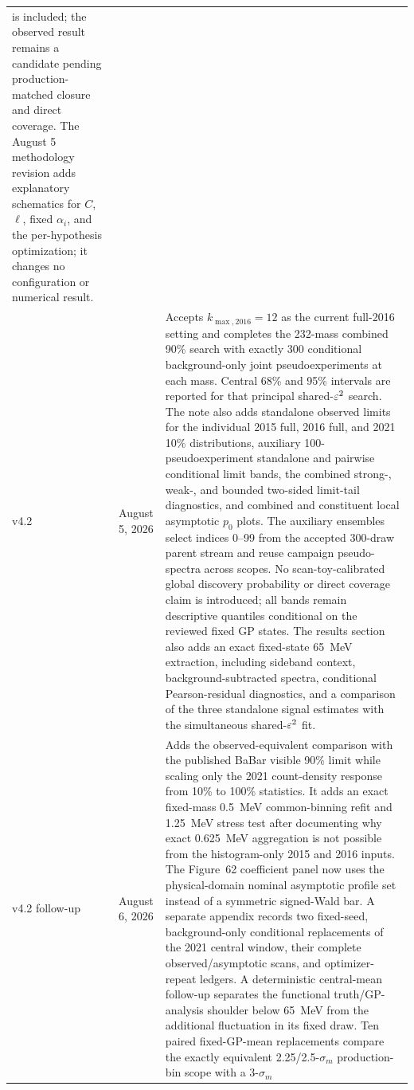 \begin{longtable}{P{0.11\textwidth}P{0.16\textwidth}P{0.64\textwidth}}
is included; the observed result remains a candidate pending production-matched
closure and direct coverage. The August 5 methodology revision adds explanatory
schematics for $C$, $\ell$, fixed $\alpha_i$, and the per-hypothesis optimization;
it changes no configuration or numerical result. \\
\addlinespace
v4.2 & August 5, 2026 &
Accepts $k_{\max,2016}=12$ as the current full-2016 setting and completes the
232-mass combined 90\% \CLs{} search with exactly 300 conditional background-only
joint pseudoexperiments at each mass. Central 68\% and 95\% intervals are
reported for that principal shared-$\varepsilon^2$ search. The note also adds
standalone observed limits for the individual 2015 full, 2016 full, and 2021
10\% distributions, auxiliary 100-pseudoexperiment standalone and pairwise
conditional limit bands, the combined strong-, weak-, and bounded two-sided
limit-tail diagnostics, and combined and constituent local asymptotic $p_0$
plots. The auxiliary ensembles select indices 0--99 from the accepted
300-draw parent stream and reuse campaign pseudo-spectra across scopes. No
scan-toy-calibrated global discovery probability or direct coverage claim is
introduced; all bands remain descriptive quantiles conditional on the reviewed
fixed GP states. The results section also
adds an exact fixed-state 65~MeV extraction, including sideband context,
background-subtracted spectra, conditional Pearson-residual diagnostics, and a
comparison of the three standalone signal estimates with the simultaneous
shared-$\varepsilon^2$ fit. \\
\addlinespace
v4.2 follow-up & August 6, 2026 &
Adds the observed-equivalent comparison with the published BaBar visible
90\% limit while scaling only the 2021 count-density response from 10\% to
100\% statistics.  It adds an exact fixed-mass 0.5~MeV common-binning refit
and 1.25~MeV stress test after documenting why exact 0.625~MeV aggregation is
not possible from the histogram-only 2015 and 2016 inputs.  The Figure~62
coefficient panel now uses the physical-domain nominal asymptotic profile set
instead of a symmetric signed-Wald bar.  A separate appendix records two
fixed-seed, background-only conditional replacements of the 2021 central
window, their complete observed/asymptotic scans, and optimizer-repeat
ledgers.  A deterministic central-mean follow-up separates the functional
truth/GP-analysis shoulder below 65~MeV from the additional fluctuation in its
fixed draw.  Ten paired fixed-GP-mean replacements compare the exactly
equivalent 2.25/2.5-$\sigma_m$ production-bin scope with a 3-$\sigma_m$

\end{longtable}
